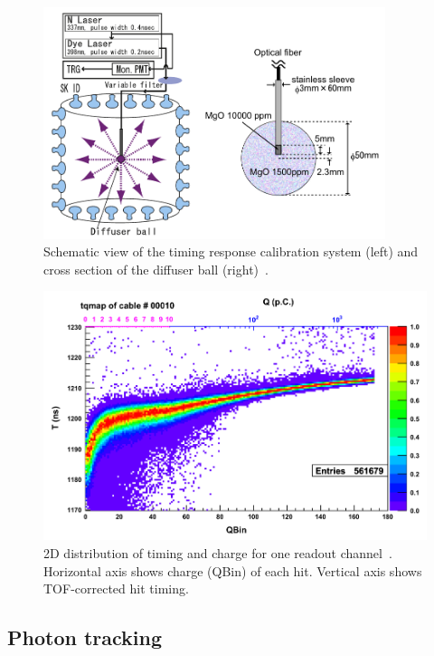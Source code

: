 \begin{figure}[H]
	\centering
	\includegraphics[width=10cm]{Figures/Calibration/TimingCalib}
	\caption[Schematic view of the timing response calibration system and cross section of the diffuser ball]{
	Schematic view of the timing response calibration system (left) and cross section of the diffuser ball (right)~\cite{2014AbeCalib}.
	}\label{Calibration_TimingCalib}
\end{figure}

\begin{figure}[H]
	\centering
	\includegraphics[width=12cm]{Figures/Calibration/TQ}
	\caption[2D distribution of timing and charge for one readout channel]{
	2D distribution of timing and charge for one readout channel~\cite{2014AbeCalib}.
	Horizontal axis shows charge (QBin) of each hit. Vertical axis shows TOF-corrected hit timing.
	}\label{Calibration_TQ}
\end{figure}





\subsection{Photon tracking}

